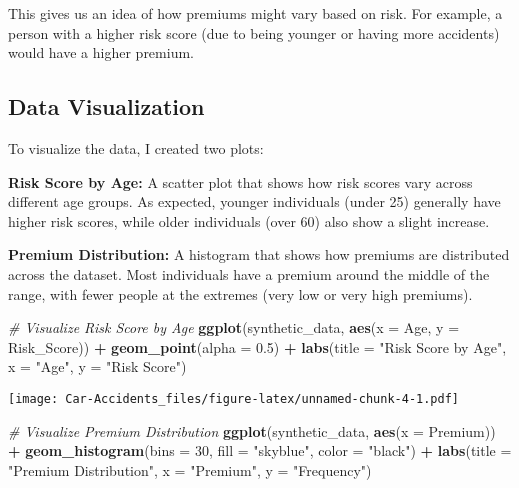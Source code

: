\documentclass[
]{article}
\newenvironment{Shaded}{\begin{snugshade}}{\end{snugshade}}
\newcommand{\AttributeTok}[1]{\textcolor[rgb]{0.13,0.29,0.53}{#1}}
\newcommand{\CommentTok}[1]{\textcolor[rgb]{0.56,0.35,0.01}{\textit{#1}}}
\newcommand{\DecValTok}[1]{\textcolor[rgb]{0.00,0.00,0.81}{#1}}
\newcommand{\FloatTok}[1]{\textcolor[rgb]{0.00,0.00,0.81}{#1}}
\newcommand{\FunctionTok}[1]{\textcolor[rgb]{0.13,0.29,0.53}{\textbf{#1}}}
\newcommand{\NormalTok}[1]{#1}
\newcommand{\SpecialCharTok}[1]{\textcolor[rgb]{0.81,0.36,0.00}{\textbf{#1}}}
\newcommand{\StringTok}[1]{\textcolor[rgb]{0.31,0.60,0.02}{#1}}
\begin{document}
This gives us an idea of how premiums might vary based on risk. For
example, a person with a higher risk score (due to being younger or
having more accidents) would have a higher premium.

\subsection{Data Visualization}\label{data-visualization}

To visualize the data, I created two plots:

\textbf{Risk Score by Age:} A scatter plot that shows how risk scores
vary across different age groups. As expected, younger individuals
(under 25) generally have higher risk scores, while older individuals
(over 60) also show a slight increase.

\textbf{Premium Distribution:} A histogram that shows how premiums are
distributed across the dataset. Most individuals have a premium around
the middle of the range, with fewer people at the extremes (very low or
very high premiums).

\begin{Shaded}
\begin{Highlighting}[]
\CommentTok{\# Visualize Risk Score by Age}
\FunctionTok{ggplot}\NormalTok{(synthetic\_data, }\FunctionTok{aes}\NormalTok{(}\AttributeTok{x =}\NormalTok{ Age, }\AttributeTok{y =}\NormalTok{ Risk\_Score)) }\SpecialCharTok{+}
  \FunctionTok{geom\_point}\NormalTok{(}\AttributeTok{alpha =} \FloatTok{0.5}\NormalTok{) }\SpecialCharTok{+}
  \FunctionTok{labs}\NormalTok{(}\AttributeTok{title =} \StringTok{"Risk Score by Age"}\NormalTok{, }\AttributeTok{x =} \StringTok{"Age"}\NormalTok{, }\AttributeTok{y =} \StringTok{"Risk Score"}\NormalTok{)}
\end{Highlighting}
\end{Shaded}

\texttt{[image: Car-Accidents\_files/figure-latex/unnamed-chunk-4-1.pdf]}

\begin{Shaded}
\begin{Highlighting}[]
\CommentTok{\# Visualize Premium Distribution}
\FunctionTok{ggplot}\NormalTok{(synthetic\_data, }\FunctionTok{aes}\NormalTok{(}\AttributeTok{x =}\NormalTok{ Premium)) }\SpecialCharTok{+}
  \FunctionTok{geom\_histogram}\NormalTok{(}\AttributeTok{bins =} \DecValTok{30}\NormalTok{, }\AttributeTok{fill =} \StringTok{"skyblue"}\NormalTok{, }\AttributeTok{color =} \StringTok{"black"}\NormalTok{) }\SpecialCharTok{+}
  \FunctionTok{labs}\NormalTok{(}\AttributeTok{title =} \StringTok{"Premium Distribution"}\NormalTok{, }\AttributeTok{x =} \StringTok{"Premium"}\NormalTok{, }\AttributeTok{y =} \StringTok{"Frequency"}\NormalTok{)}
\end{Highlighting}
\end{Shaded}
\end{document}
